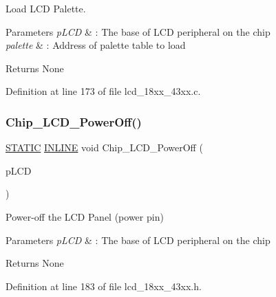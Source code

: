 Load L\+CD Palette. 


\begin{DoxyParams}{Parameters}
{\em p\+L\+CD} & \+: The base of L\+CD peripheral on the chip \\
\hline
{\em palette} & \+: Address of palette table to load \\
\hline
\end{DoxyParams}
\begin{DoxyReturn}{Returns}
None 
\end{DoxyReturn}


Definition at line 173 of file lcd\+\_\+18xx\+\_\+43xx.\+c.

\mbox{\label{group___l_c_d__18_x_x__43_x_x_ga993223c458c548b5e05705a9a5895228}} 
\subsubsection{\texorpdfstring{Chip\+\_\+\+L\+C\+D\+\_\+\+Power\+Off()}{Chip\_LCD\_PowerOff()}}
{\footnotesize\ttfamily \hyperlink{group___l_p_c___types___public___macros_ga10b2d890d871e1489bb02b7e70d9bdfb}{S\+T\+A\+T\+IC} \hyperlink{spifi__18xx__43xx_8h_a2eb6f9e0395b47b8d5e3eeae4fe0c116}{I\+N\+L\+I\+NE} void Chip\+\_\+\+L\+C\+D\+\_\+\+Power\+Off (\begin{DoxyParamCaption}\item[{\hyperlink{struct_l_p_c___l_c_d___t}{L\+P\+C\+\_\+\+L\+C\+D\+\_\+T} $\ast$}]{p\+L\+CD }\end{DoxyParamCaption})}



Power-\/off the L\+CD Panel (power pin) 


\begin{DoxyParams}{Parameters}
{\em p\+L\+CD} & \+: The base of L\+CD peripheral on the chip \\
\hline
\end{DoxyParams}
\begin{DoxyReturn}{Returns}
None 
\end{DoxyReturn}


Definition at line 183 of file lcd\+\_\+18xx\+\_\+43xx.\+h.


